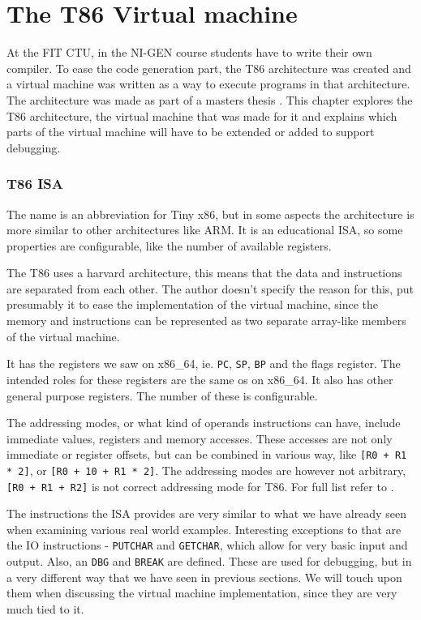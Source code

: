 \chapter{The T86 Virtual machine}
At the FIT CTU, in the NI-GEN course students have to write their own compiler.
To ease the code generation part, the T86 architecture was created and a
virtual machine was written as a way to execute programs in that architecture.
The architecture was made as part of a masters thesis \cite{ivo2021tiny}.
This chapter explores the T86 architecture, the virtual machine that was made
for it and explains which parts of the virtual machine will have to be extended
or added to support debugging.
\subsection{T86 ISA}
The name is an abbreviation for Tiny x86, but in some aspects the architecture
is more similar to other architectures like ARM. It is an educational ISA, so
some properties are configurable, like the number of available registers.

The T86 uses a harvard architecture, this means that the data and instructions
are separated from each other. The author doesn't specify the reason for this,
put presumably it to ease the implementation of the virtual machine, since
the memory and instructions can be represented as two separate array-like
members of the virtual machine.

It has the registers we saw on x86\_64, ie. \texttt{PC}, \texttt{SP},
\texttt{BP} and the flags register. The intended roles for these registers are
the same os on x86\_64. It also has other general purpose registers. The number
of these is configurable.

The addressing modes, or what kind of operands instructions can have, include
immediate values, registers and memory accesses. These accesses are not only
immediate or register offsets, but can be combined in various way, like
\texttt{[R0 + R1 * 2]}, or \texttt{[R0 + 10 + R1 * 2]}. The addressing modes
are however not arbitrary, \texttt{[R0 + R1 + R2]} is not correct addressing
mode for T86. For full list refer to \cite{ivo2021tiny}.

The instructions the ISA provides are very similar to what we have already seen
when examining various real world examples. Interesting exceptions to that are
the IO instructions - \texttt{PUTCHAR} and \texttt{GETCHAR}, which allow for
very basic input and output. Also, an \texttt{DBG} and \texttt{BREAK} are
defined. These are used for debugging, but in a very different way that we have
seen in previous sections. We will touch upon them when discussing the virtual
machine implementation, since they are very much tied to it.
